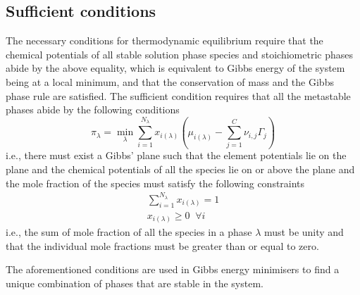 	\subsection{Sufficient conditions}
    	The necessary conditions for thermodynamic equilibrium require that the chemical potentials of all stable solution phase species and stoichiometric phases abide by the above equality, which is equivalent to Gibbs energy of the system being at a local minimum, and that the conservation of mass and the Gibbs phase rule are satisfied. The sufficient condition requires that all the metastable phases abide by the following conditions 
    	\begin{equation*}
        		\pi_{\lambda} = \min_{\lambda} \sum_{i=1}^{N_{\lambda}}x_{i({\lambda})} \left (\mu_{i({\lambda})} - \sum_{j=1}^C \nu_{i,j}\Gamma_j \right )
    	\end{equation*}
    	i.e., there must exist a Gibbs' plane such that the element potentials lie on the plane and the chemical potentials of all the species lie on or above the plane and the mole fraction of the species must satisfy the following constraints
	\begin{equation}
        		\begin{aligned}
            		\sum_{i=1}^{N_{\lambda}}x_{i({\lambda})} = 1 \\
			x_{i({\lambda})} \geq 0 \;\; \forall i
        		\end{aligned}
    	\end{equation}
    	i.e., the sum of mole fraction of all the species in a phase $\lambda$ must be unity and that the individual mole fractions must be greater than or equal to zero.
    
    	The aforementioned conditions are used in Gibbs energy minimisers to find a unique combination of phases that are stable in the system.
